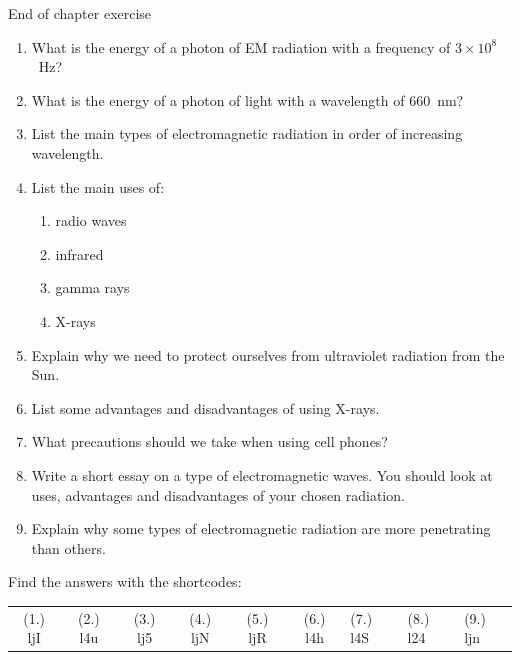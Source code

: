             \begin{eocexercises}{End of chapter exercise}
            \nopagebreak
      \label{m38779*id189872}\begin{enumerate}[noitemsep, label=\textbf{\arabic*}. ] 
            \label{m38779*uid34}\item What is the energy of a photon of EM radiation with a frequency of $3\ensuremath{\times}{10}^{8}$~Hz?\newline
\label{m38779*uid35}\item What is the energy of a photon of light with a wavelength of 660~nm?\newline
\label{m38779*uid36}\item List the main types of electromagnetic radiation in order of increasing wavelength.\newline
\label{m38779*uid37}\item List the main uses of:
\label{m38779*id189946}\begin{enumerate}[noitemsep, label=\textbf{\alph*}. ] 
            \label{m38779*uid38}\item radio waves
\label{m38779*uid39}\item infrared
\label{m38779*uid40}\item gamma rays
\label{m38779*uid41}\item X-rays
\end{enumerate}
                \label{m38779*uid42}\item Explain why we need to protect ourselves from ultraviolet radiation from the Sun.\newline
\label{m38779*uid43}\item List some advantages and disadvantages of using X-rays.\newline
\label{m38779*uid44}\item What precautions should we take when using cell phones?\newline
\label{m38779*uid45}\item Write a short essay on a type of electromagnetic waves. You should look at uses, advantages and disadvantages of your chosen radiation.\newline
\label{m38779*uid46}\item Explain why some types of electromagnetic radiation are more penetrating than others.\newline
\end{enumerate}
  \label{m38779**end}
  \label{459e2bef85baf867f5850bc8338cad3a**end}
\par {} Find the answers with the shortcodes:
 \par \begin{tabular}[h]{cccccc}
 (1.) ljI  &  (2.) l4u  &  (3.) lj5  &  (4.) ljN  &  (5.) ljR  &  (6.) l4h  &  (7.) l4S  &  (8.) l24  &  (9.) ljn  & \end{tabular}
\end{eocexercises}